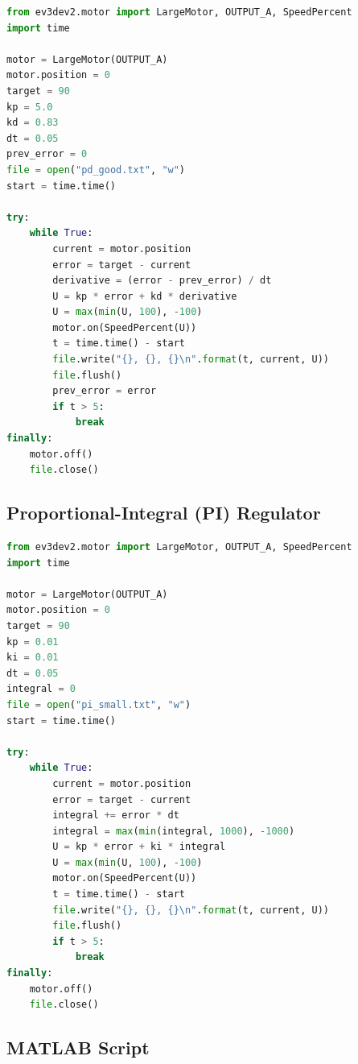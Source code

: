 \documentclass[a4paper, 12pt]{article}
\begin{document}
\begin{lstlisting}[language=Python, caption={PD Regulator (3pd-control.py)}]
from ev3dev2.motor import LargeMotor, OUTPUT_A, SpeedPercent
import time

motor = LargeMotor(OUTPUT_A)
motor.position = 0
target = 90
kp = 5.0
kd = 0.83
dt = 0.05
prev_error = 0
file = open("pd_good.txt", "w")
start = time.time()

try:
    while True:
        current = motor.position
        error = target - current
        derivative = (error - prev_error) / dt
        U = kp * error + kd * derivative
        U = max(min(U, 100), -100)
        motor.on(SpeedPercent(U))
        t = time.time() - start
        file.write("{}, {}, {}\n".format(t, current, U))
        file.flush()
        prev_error = error
        if t > 5:
            break
finally:
    motor.off()
    file.close()
\end{lstlisting}

\subsection{Proportional-Integral (PI) Regulator}

\begin{lstlisting}[language=Python, caption={PI Regulator (4pi\_control.py)}]
from ev3dev2.motor import LargeMotor, OUTPUT_A, SpeedPercent
import time

motor = LargeMotor(OUTPUT_A)
motor.position = 0
target = 90
kp = 0.01
ki = 0.01
dt = 0.05
integral = 0
file = open("pi_small.txt", "w")
start = time.time()

try:
    while True:
        current = motor.position
        error = target - current
        integral += error * dt
        integral = max(min(integral, 1000), -1000)
        U = kp * error + ki * integral
        U = max(min(U, 100), -100)
        motor.on(SpeedPercent(U))
        t = time.time() - start
        file.write("{}, {}, {}\n".format(t, current, U))
        file.flush()
        if t > 5:
            break
finally:
    motor.off()
    file.close()
\end{lstlisting}

\subsection{MATLAB Script}
\end{document}
